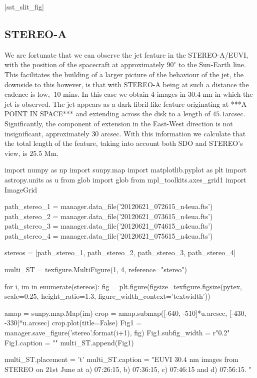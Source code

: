 \documentclass{emulateapj}
\begin{document}
|sst_slit_fig|



\subsection{STEREO-A}
We are fortunate that we can observe the jet feature in the STEREO-A/EUVI, with the position of the spacecraft at approximately $90^\circ$ to the Sun-Earth line.
This facilitates the building of a larger picture of the behaviour of the jet, the downside to this however, is that with STEREO-A being at such a distance the cadence is low, $~10$ mins.
In this case we obtain 4 images in $30.4$ nm in which the jet is observed.
The jet appears as a dark fibril like feature originating at ***A POINT IN SPACE*** and extending across the disk to a length of $45.1$arcsec.
Significantly, the component of extension in the East-West direction is not insignificant, approximately $30$ arcsec.
With this information we calculate that the total length of the feature, taking into account both SDO and STEREO's view, is $25.5$ Mm.



\begin{pycode}[STEREO]
import numpy as np
import sunpy.map
import matplotlib.pyplot as plt
import astropy.units as u
from glob import glob
from mpl_toolkits.axes_grid1 import ImageGrid

path_stereo_1 = manager.data_file('20120621_072615_n4eua.fts')
path_stereo_2 = manager.data_file('20120621_073615_n4eua.fts')
path_stereo_3 = manager.data_file('20120621_074615_n4eua.fts')
path_stereo_4 = manager.data_file('20120621_075615_n4eua.fts')

stereos = [path_stereo_1, path_stereo_2, path_stereo_3, path_stereo_4]


multi_ST = texfigure.MultiFigure(1, 4, reference="stereo")


for i, im in enumerate(stereos):
	fig = plt.figure(figsize=texfigure.figsize(pytex, scale=0.25, height_ratio=1.3, figure_width_context='textwidth'))
	
	amap = sunpy.map.Map(im)
	crop = amap.submap([-640, -510]*u.arcsec, [-430, -330]*u.arcsec)
	crop.plot(title=False)
	Fig1 = manager.save_figure('stereo{}'.format(i+1), fig)
	Fig1.subfig_width = r"0.2\textwidth"
	Fig1.caption = ""
	multi_ST.append(Fig1)

multi_ST.placement = 't'
multi_ST.caption = "EUVI $30.4$ nm images from STEREO on $21$st June at a) 07:26:15, b) 07:36:15, c) 07:46:15 and d) 07:56:15. "
\end{pycode}
\end{document}
